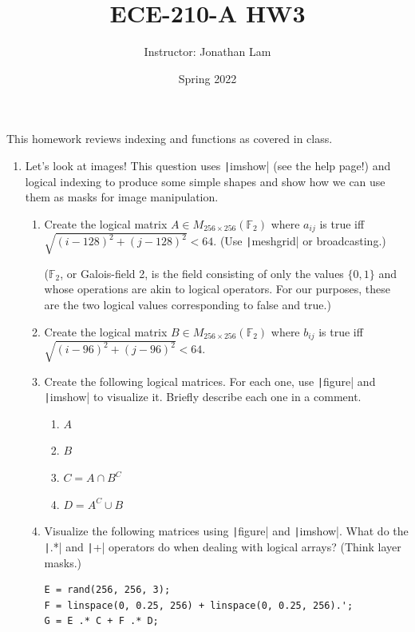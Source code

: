 \documentclass{article}
\title{ECE-210-A HW3}
\author{Instructor: Jonathan Lam}
\date{Spring 2022}
\begin{document}
\maketitle

\noindent This homework reviews indexing and functions as covered in class.

\begin{enumerate}
\item
  Let's look at images! This question uses \texttt|imshow| (see the help page!) and logical indexing to produce some simple shapes and show how we can use them as masks for image manipulation.
  
  \begin{enumerate}
  \item Create the logical matrix $A\in M_{256\times 256}(\mathbb{F}_2)$ where $a_{ij}$ is true iff $\sqrt{(i-128)^2+(j-128)^2}<64$. (Use \texttt|meshgrid| or broadcasting.)
    
    ($\mathbb{F}_2$, or Galois-field 2, is the field consisting of only the values $\{0,1\}$ and whose operations are akin to logical operators. For our purposes, these are the two logical values corresponding to false and true.)
    
  \item Create the logical matrix $B\in M_{256\times 256}(\mathbb{F}_2)$ where $b_{ij}$ is true iff $\sqrt{(i-96)^2+(j-96)^2}<64$.
    
  \item Create the following logical matrices. For each one, use \texttt|figure| and \texttt|imshow| to visualize it. Briefly describe each one in a comment.
    \begin{enumerate}
    \item $A$
    \item $B$
    \item $C=A\cap B^C$
    \item $D=A^C\cup B$
    \end{enumerate}
    
  \item Visualize the following matrices using \texttt|figure| and \texttt|imshow|. What do the \texttt|.*| and \texttt|+| operators do when dealing with logical arrays? (Think layer masks.)
\begin{verbatim}
E = rand(256, 256, 3);
F = linspace(0, 0.25, 256) + linspace(0, 0.25, 256).';
G = E .* C + F .* D;
\end{verbatim}
    

\end{enumerate}
\end{enumerate}
\end{document}
